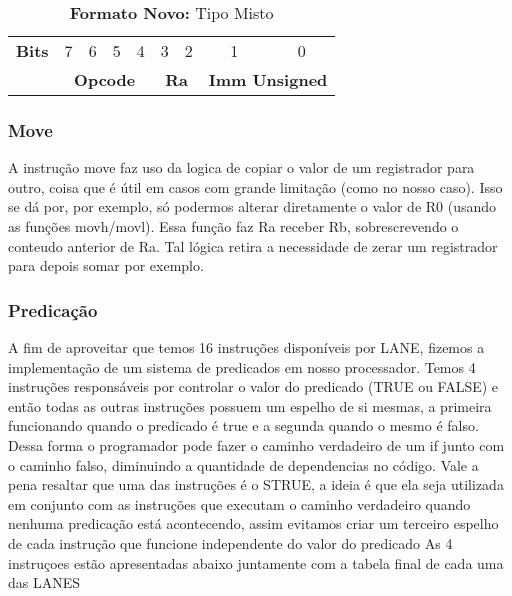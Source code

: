 \documentclass{article}
\begin{document}
    \begin{table}[h]
      \captionsetup{labelformat=empty, skip=0pt}
      \caption{\textbf{Formato Novo:} Tipo Misto}
      \centering
      \begin{tabular}{|c|*{8}{c|}}
        \hline
        \rowcolor{red!50}
        \multicolumn{9}{|c|}{\textbf{Tipo INC}} \\ \hline
        \textbf{Bits} & 7 & 6 & 5 & 4 & 3 & 2 & 1 & 0 \\ \hline
        & \multicolumn{4}{c|}{\textbf{Opcode}} & \multicolumn{2}{c|}{\textbf{Ra}} & \multicolumn{2}{c|}{\textbf{Imm Unsigned}} \\ \hline
      \end{tabular}
    \end{table}

    \subsubsection{Move}

    A instrução move faz uso da logica de copiar o valor de um registrador para outro, coisa que é 
    útil em casos com grande limitação (como no nosso caso). Isso se dá por, por exemplo, só podermos alterar
    diretamente o valor de R0 (usando as funções movh/movl).
    Essa função faz Ra receber Rb, sobrescrevendo o conteudo anterior de Ra. Tal lógica retira a necessidade de
    zerar um registrador para depois somar por exemplo.

    \subsubsection{Predicação}

    A fim de aproveitar que temos 16 instruções disponíveis por LANE, fizemos a implementação de um sistema de predicados em nosso processador.
    Temos 4 instruções responsáveis por controlar o valor do predicado (TRUE ou FALSE) e então todas as outras instruções possuem um espelho de si mesmas, a primeira funcionando quando o predicado é true e a segunda quando o mesmo é falso.
    Dessa forma o programador pode fazer o caminho verdadeiro de um if junto com o caminho falso, diminuindo a quantidade de dependencias no código.
    Vale a pena resaltar que uma das instruções é o STRUE, a ideia é que ela seja utilizada em conjunto com as instruções que executam o caminho verdadeiro quando nenhuma predicação está acontecendo, assim evitamos criar um terceiro espelho de cada instrução que funcione independente do valor do predicado
    As 4 instruçoes estão apresentadas abaixo juntamente com a tabela final de cada uma das LANES    
\end{document}
